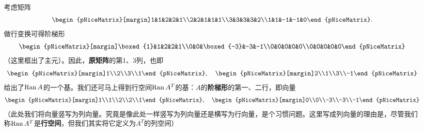 \begin{example*}
  考虑矩阵\[\begin{pNiceMatrix}[margin]1&1&2&2&1\\2&2&1&1&1\\3&3&3&3&2\\1&1&-1&-1&0\end{pNiceMatrix}.\]
  做行变换可得阶梯形\[\begin{pNiceMatrix}[margin]\boxed{1}&1&2&2&1\\0&0&\boxed{-3}&-3&-1\\0&0&0&0&0\\0&0&0&0&0\end{pNiceMatrix}\]
  （这里框出了主元）。因此，{\bf 原矩阵}的第1、3列，也即\[\begin{pNiceMatrix}[margin]1\\2\\3\\1\end{pNiceMatrix},\quad\begin{pNiceMatrix}[margin]2\\1\\3\\-1\end{pNiceMatrix}\]
  给出了$\operatorname{Ran} A$的一个基。我们还可马上得到行空间$\operatorname{Ran} A^T$的基：$A$的{\bf 阶梯形}的第一、二行，即向量\[\begin{pNiceMatrix}[margin]1\\1\\2\\2\\1\end{pNiceMatrix},\quad\begin{pNiceMatrix}[margin]0\\0\\-3\\-3\\-1\end{pNiceMatrix}\]
  （此处我们将向量竖写为列向量。究竟是像此处一样竖写为列向量还是横写为行向量，是个习惯问题。这里写成列向量的理由是，尽管我们称$\operatorname{Ran} A^T$是{\bf 行空间}，但我们其实将它定义为$A^T$的列空间）


\end{example*}
